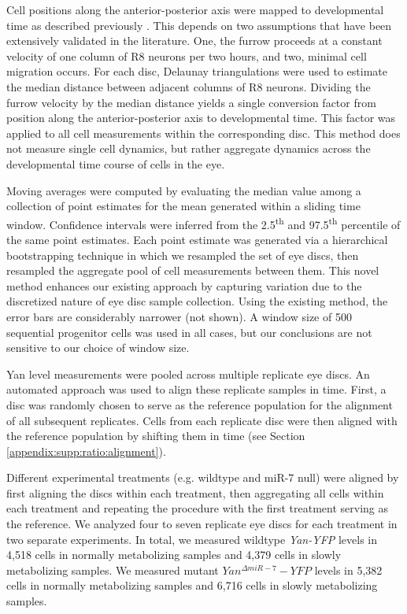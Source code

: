 Cell positions along the anterior-posterior axis were mapped to developmental time as described previously \cite{Pelaez2015}. This depends on two assumptions that have been extensively validated in the literature. One, the furrow proceeds at a constant velocity of one column of R8 neurons per two hours, and two, minimal cell migration occurs. For each disc, Delaunay triangulations were used to estimate the median distance between adjacent columns of R8 neurons. Dividing the furrow velocity by the median distance yields a single conversion factor from position along the anterior-posterior axis to developmental time. This factor was applied to all cell measurements within the corresponding disc. This method does not measure single cell dynamics, but rather aggregate dynamics across the developmental time course of cells in the eye.

Moving averages were computed by evaluating the median value among a collection of point estimates for the mean generated within a sliding time window. Confidence intervals were inferred from the 2.5\textsuperscript{th} and 97.5\textsuperscript{th} percentile of the same point estimates. Each point estimate was generated via a hierarchical bootstrapping technique in which we resampled the set of eye discs, then resampled the aggregate pool of cell measurements between them. This novel method enhances our existing approach \cite{Pelaez2015} by capturing variation due to the discretized nature of eye disc sample collection. Using the existing method, the error bars are considerably narrower (not shown). A window size of 500 sequential progenitor cells was used in all cases, but our conclusions are not sensitive to our choice of window size.

Yan level measurements were pooled across multiple replicate eye discs. An automated approach was used to align these replicate samples in time. First, a disc was randomly chosen to serve as the reference population for the alignment of all subsequent replicates. Cells from each replicate disc were then aligned with the reference population by shifting them in time (see Section \ref{appendix:supp:ratio:alignment}).

Different experimental treatments (e.g. wildtype and miR-7 null) were aligned by first aligning the discs within each treatment, then aggregating all cells within each treatment and repeating the procedure with the first treatment serving as the reference. We analyzed four to seven replicate eye discs for each treatment in two separate experiments. In total, we measured wildtype \textit{Yan-YFP} levels in 4,518 cells in normally metabolizing samples and 4,379 cells in slowly metabolizing samples. We measured mutant $Yan^{\Delta miR-7}-YFP$ levels in 5,382 cells in normally metabolizing samples and 6,716 cells in slowly metabolizing samples.

